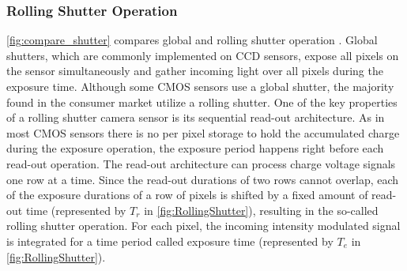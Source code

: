 \subsubsection{Rolling Shutter Operation}
\autoref{fig:compare_shutter} compares global and rolling shutter operation \cite{imagesensor}. Global shutters, which are commonly implemented on CCD sensors, expose all pixels on the sensor simultaneously and gather incoming light over all pixels during the exposure time. 
Although some CMOS sensors use a global shutter, the majority found in the consumer market utilize a rolling shutter. 
One of the key properties of a rolling shutter camera sensor is its sequential read-out architecture. 
As in most CMOS sensors there is no per pixel storage to hold the accumulated charge during the exposure operation, the exposure period happens right before each read-out operation. 
The read-out architecture can process charge voltage signals one row at a time. 
Since the read-out durations of two rows cannot overlap, each of the exposure durations of a row of pixels is shifted by a fixed amount of read-out time (represented by $T_r$ in \autoref{fig:RollingShutter}), resulting in the so-called rolling shutter operation.
For each pixel, the incoming intensity modulated signal is integrated for a time period called exposure time (represented by $T_e$ in \autoref{fig:RollingShutter}). 

